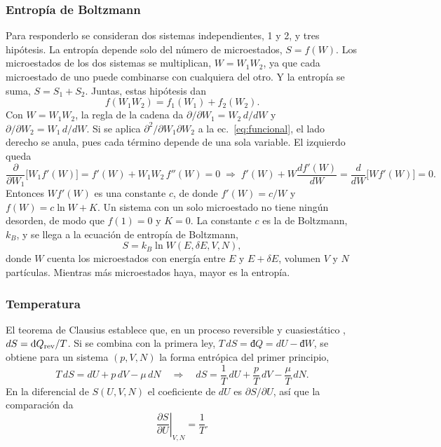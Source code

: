 \documentclass[letterpaper,12pt]{article}
\begin{document}
\subsubsection*{Entropía de Boltzmann}
Para responderlo se consideran dos sistemas independientes, 1 y 2, y tres hipótesis. La entropía depende solo del número de microestados, $S=f(W)$. Los microestados de los dos sistemas se multiplican, $W=W_1W_2$, ya que cada microestado de uno puede combinarse con cualquiera del otro. Y la entropía se suma, $S=S_1+S_2$. Juntas, estas hipótesis dan
\begin{equation}
  f(W_1W_2)=f_1(W_1)+f_2(W_2).
  \label{eq:funcional}
\end{equation}
Con $W=W_1W_2$, la regla de la cadena da $\partial/\partial W_1=W_2\,d/dW$ y $\partial/\partial W_2=W_1\,d/dW$. Si se aplica $\partial^2/\partial W_1\partial W_2$ a la ec.~\ref{eq:funcional}, el lado derecho se anula, pues cada término depende de una sola variable. El izquierdo queda
\begin{equation}
  \frac{\partial}{\partial W_1}\Big[W_1f'(W)\Big]=f'(W)+W_1W_2\,f''(W)=0
  \;\Rightarrow\;
  f'(W)+W\frac{df'(W)}{dW}=\frac{d}{dW}\Big[Wf'(W)\Big]=0 .
\end{equation}
Entonces $Wf'(W)$ es una constante $c$, de donde $f'(W)=c/W$ y $f(W)=c\ln W+K$. Un sistema con un solo microestado no tiene ningún desorden, de modo que $f(1)=0$ y $K=0$. La constante $c$ es la de Boltzmann, $k_B$, y se llega a la ecuación de entropía de Boltzmann,
\begin{equation}
  S=k_B\ln W(E,\delta E,V,N),
  \label{eq:sboltzmann}
\end{equation}
donde $W$ cuenta los microestados con energía entre $E$ y $E+\delta E$, volumen $V$ y $N$ partículas. Mientras más microestados haya, mayor es la entropía.

\subsubsection*{Temperatura}
El teorema de Clausius establece que, en un proceso reversible y cuasiestático \cite{garciacolin}, $dS=\text{đ}Q_{\rm rev}/T$. Si se combina con la primera ley, $T\,dS=\text{đ}Q=dU-\text{đ}W$, se obtiene para un sistema $(p,V,N)$ la forma entrópica del primer principio,
\begin{equation}
  T\,dS=dU+p\,dV-\mu\,dN
  \quad\Rightarrow\quad
  dS=\frac{1}{T}\,dU+\frac{p}{T}\,dV-\frac{\mu}{T}\,dN .
\end{equation}
En la diferencial de $S(U,V,N)$ el coeficiente de $dU$ es $\partial S/\partial U$, así que la comparación da
\begin{equation}
  \left.\frac{\partial S}{\partial U}\right|_{V,N}=\frac{1}{T}.
  \label{eq:temperatura}
\end{equation}
\end{document}
